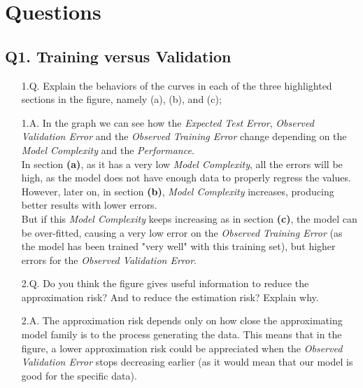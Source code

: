 \documentclass[11pt]{scrartcl}
\begin{document}
    \newpage


    \section{Questions}

    \subsection{Q1. Training versus Validation}
    \begin{itemize}
        \item[1.Q.] Explain the behaviors of the curves in each of the three highlighted sections in the figure, namely (a), (b), and (c);
        \item[1.A.] In the graph we can see how the \textit{Expected Test Error}, \textit{Observed Validation Error} and the \textit{Observed Training Error} change depending on the \textit{Model Complexity} and the \textit{Performance}.\\
        In section \textbf{(a)}, as it has a very low \textit{Model Complexity}, all the errors will be high, as the model does not have enough data to properly regress the values.\\
        However, later on, in section \textbf{(b)}, \textit{Model Complexity} increases, producing better results with lower errors.\\
        But if this \textit{Model Complexity} keeps increasing as in section \textbf{(c)}, the model can be over-fitted, causing a very low error on the \textit{Observed Training Error} (as the model has been trained "very well" with this training set), but higher errors for the \textit{Observed Validation Error}.\\
        \item[2.Q.] Do you think the figure gives useful information to reduce the approximation risk? And to reduce the estimation risk? Explain why.
        \item[2.A.] The approximation risk depends only on how close the approximating model family is to the process generating the data. This means that in the figure, a lower approximation risk could be appreciated when the \textit{Observed Validation Error} stops decreasing earlier (as it would mean that our model is good for the specific data).\\

\end{itemize}
\end{document}
